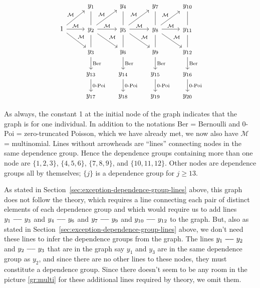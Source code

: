 \begin{equation} \label{gr:multi}
\begin{tikzcd}
  \hphantom{1} & y_1 & y_4 & y_7 & y_{10}
  \\
  1
  \arrow{r}{\mathcal{M}}
  \arrow{rd}{\mathcal{M}}
  \arrow{ru}{\mathcal{M}}
  & y_2
  \arrow[dash]{u}
  \arrow[dash]{d}
  \arrow{r}{\mathcal{M}}
  \arrow{rd}{\mathcal{M}}
  \arrow{ru}{\mathcal{M}}
  & y_5
  \arrow[dash]{u}
  \arrow[dash]{d}
  \arrow{r}{\mathcal{M}}
  \arrow{rd}{\mathcal{M}}
  \arrow{ru}{\mathcal{M}}
  & y_8
  \arrow[dash]{u}
  \arrow[dash]{d}
  \arrow{r}{\mathcal{M}}
  \arrow{rd}{\mathcal{M}}
  \arrow{ru}{\mathcal{M}}
  & y_{11}
  \arrow[dash]{u}
  \arrow[dash]{d}
  \\
  \hphantom{1} & y_3 \arrow{d}{\text{Ber}} & y_6 \arrow{d}{\text{Ber}}
  & y_9 \arrow{d}{\text{Ber}} & y_{12} \arrow{d}{\text{Ber}}
  \\
  \hphantom{1} & y_{13} \arrow{d}{\text{0-Poi}}
  & y_{14} \arrow{d}{\text{0-Poi}}
  & y_{15} \arrow{d}{\text{0-Poi}} & y_{16} \arrow{d}{\text{0-Poi}}
  \\
  \hphantom{1} & y_{17} & y_{18} & y_{19} & y_{20}
\end{tikzcd}
\end{equation}

As always, the constant 1 at the initial node
of the graph indicates that the graph is for one individual.
In addition to the notations Ber = Bernoulli
and 0-Poi = zero-truncated Poisson, which we have already met,
we now also have $\mathcal{M}$ = multinomial.
Lines without arrowheads are ``lines'' connecting nodes in the
same dependence group.  Hence the dependence groups containing more than
one node are $\{1, 2, 3\}$, $\{4, 5, 6\}$, $\{7, 8, 9\}$, and $\{10, 11, 12\}$.
Other nodes are dependence groups all by themselves; $\{j\}$ is a dependence
group for $j \ge 13$.

As stated in Section~\ref{sec:exception-dependence-group-lines} above,
this graph does not follow the theory, which requires a line connecting
each pair of distinct elements of each dependence group and which would
require us to add lines $y_1 \myline y_3$ and $y_4 \myline y_6$
and $y_7 \myline y_9$ and $y_{10} \myline y_{12}$ to the graph.
But, also as stated in Section~\ref{sec:exception-dependence-group-lines}
above, we don't need these lines to infer the dependence groups from the
graph.  The lines $y_1 \myline y_2$ and $y_2 \myline y_3$ that are in the
graph say $y_1$ and $y_3$ are in the same dependence group as $y_2$,
and since there are no other lines to these nodes, they must constitute
a dependence group.  Since there doesn't seem to be any room in
the picture \eqref{gr:multi} for these additional lines required by theory,
we omit them.

